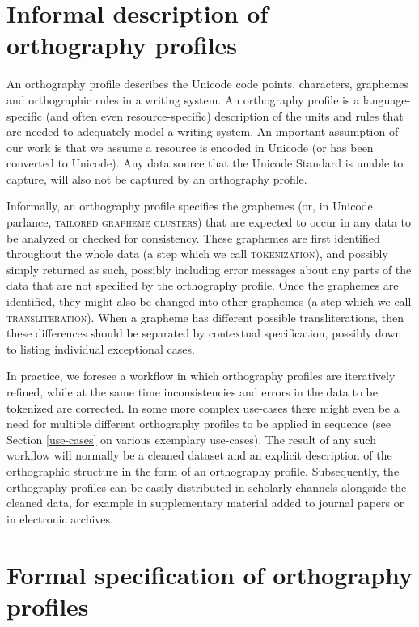 \section{Informal description of orthography profiles}
\label{informal-description-of-orthography-profiles}

An orthography profile describes the Unicode code points, characters, graphemes
and orthographic rules in a writing system. An orthography profile is a
language-specific (and often even resource-specific) description of the units
and rules that are needed to adequately model a writing system. An important
assumption of our work is that we assume a resource is encoded in Unicode (or
has been converted to Unicode). Any data source that the Unicode Standard is
unable to capture, will also not be captured by an orthography profile.

Informally, an orthography profile specifies the graphemes (or, in Unicode
parlance, \textsc{tailored grapheme clusters}) that are expected to occur in any
data to be analyzed or checked for consistency. These graphemes are first
identified throughout the whole data (a step which we call
\textsc{tokenization}), and possibly simply returned as such, possibly including
error messages about any parts of the data that are not specified by the
orthography profile. Once the graphemes are identified, they might also be
changed into other graphemes (a step which we call \textsc{transliteration}).
When a grapheme has different possible transliterations, then these differences
should be separated by contextual specification, possibly down to listing
individual exceptional cases.

In practice, we foresee a workflow in which orthography profiles are iteratively
refined, while at the same time inconsistencies and errors in the data to be
tokenized are corrected. In some more complex use-cases there might even be a
need for multiple different orthography profiles to be applied in sequence (see
Section \ref{use-cases} on various exemplary use-cases). The result of any such
workflow will normally be a cleaned dataset and an explicit description of the
orthographic structure in the form of an orthography profile. Subsequently, the
orthography profiles can be easily distributed in scholarly channels alongside
the cleaned data, for example in supplementary material added to journal papers
or in electronic archives.

\section{Formal specification of orthography profiles}
\label{formal-specification-of-orthography-profiles}

